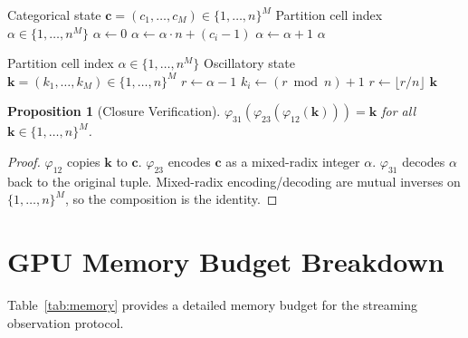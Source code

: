 \documentclass[11pt,twocolumn,a4paper]{article}
\newtheorem{proposition}[theorem]{Proposition}
\begin{document}
\begin{algorithm}[H]
\caption{$\varphi_{23}$: Categorical $\to$ Partitional}
\label{alg:phi23}
\begin{algorithmic}[1]
\Require Categorical state $\bm{c} = (c_1, \ldots, c_M) \in
  \{1,\ldots,n\}^M$
\Ensure Partition cell index $\alpha \in \{1,\ldots,n^M\}$
\State $\alpha \gets 0$
  \State $\alpha \gets \alpha \cdot n + (c_i - 1)$
\EndFor
\State $\alpha \gets \alpha + 1$
\State \Return $\alpha$
\end{algorithmic}
\end{algorithm}

\begin{algorithm}[H]
\caption{$\varphi_{31}$: Partitional $\to$ Oscillatory}
\label{alg:phi31}
\begin{algorithmic}[1]
\Require Partition cell index $\alpha \in \{1,\ldots,n^M\}$
\Ensure Oscillatory state $\bm{k} = (k_1, \ldots, k_M) \in
  \{1,\ldots,n\}^M$
\State $r \gets \alpha - 1$
  \State $k_i \gets (r \bmod n) + 1$
  \State $r \gets \lfloor r / n \rfloor$
\EndFor
\State \Return $\bm{k}$
\end{algorithmic}
\end{algorithm}

\begin{proposition}[Closure Verification]
$\varphi_{31}(\varphi_{23}(\varphi_{12}(\bm{k}))) = \bm{k}$ for
all $\bm{k} \in \{1,\ldots,n\}^M$.
\end{proposition}

\begin{proof}
$\varphi_{12}$ copies $\bm{k}$ to $\bm{c}$.
$\varphi_{23}$ encodes $\bm{c}$ as a mixed-radix integer $\alpha$.
$\varphi_{31}$ decodes $\alpha$ back to the original tuple.
Mixed-radix encoding/decoding are mutual inverses on
$\{1,\ldots,n\}^M$, so the composition is the identity.
\end{proof}


\section{GPU Memory Budget Breakdown}
\label{app:memory}

Table~\ref{tab:memory} provides a detailed memory budget for the
streaming observation protocol.
\end{document}
